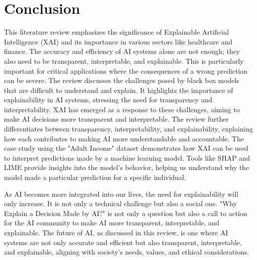 \documentclass[10pt,journal,compsoc]{IEEEtran}
\begin{document}
\section{Conclusion}

This literature review emphasizes the significance of Explainable Artificial Intelligence (XAI) and its importance in various sectors like healthcare and finance. 
The accuracy and efficiency of AI systems alone are not enough; they also need to be transparent, interpretable, and explainable. This is particularly 
important for critical applications where the consequences of a wrong prediction can be severe. The review discusses the challenges posed by black box models that 
are difficult to understand and explain. It highlights the importance of explainability in AI systems, stressing the need for transparency and interpretability. 
XAI has emerged as a response to these challenges, aiming to make AI decisions more transparent and interpretable. The review further differentiates between transparency, 
interpretability, and explainability, explaining how each contributes to making AI more understandable and accountable. The case study using the "Adult Income" dataset 
demonstrates how XAI can be used to interpret predictions made by a machine learning model. Tools like SHAP and LIME provide insights into the model's behavior, helping us 
understand why the model made a particular prediction for a specific individual.

As AI becomes more integrated into our lives, the need for explainability will only increase. It is not only a technical challenge but also a social one. 
"Why Explain a Decision Made by AI?" is not only a question but also a call to action for the AI community to make AI more transparent, interpretable, and explainable. 
The future of AI, as discussed in this review, is one where AI systems are not only accurate and efficient but also transparent, interpretable, and explainable, aligning 
with society's needs, values, and ethical considerations.

\printbibliography
\end{document}
